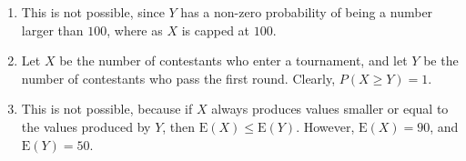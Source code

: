 \begin{enumerate}[label=(\alph*)]
\item This is not possible, since $Y$ has a non-zero probability of being a
number larger than $100$, where as $X$ is capped at $100$.

\item Let $X$ be the number of contestants who enter a tournament, and let $Y$
be the number of contestants who pass the first round. Clearly, $P(X \geq Y) =
1$.

\item This is not possible, because if $X$ always produces values smaller or
equal to the values produced by $Y$, then $\text{E}(X) \leq \text{E}(Y)$.
However, $\text{E}(X) = 90$, and $\text{E}(Y) = 50$.
\end{enumerate}